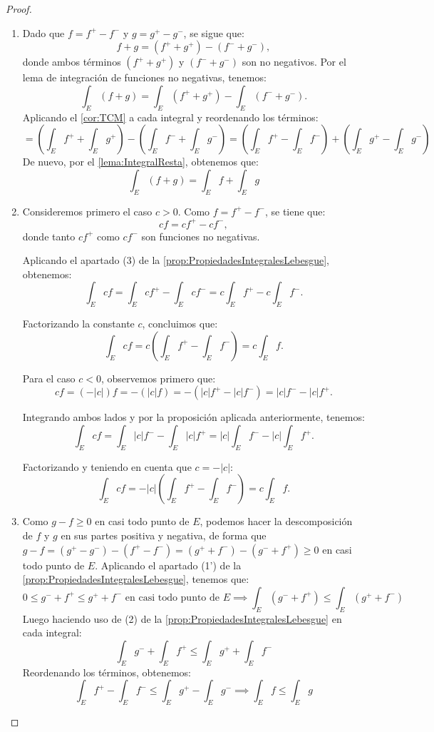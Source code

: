 \begin{proof}
    \leavevmode
    \begin{enumerate}
        \item Dado que $f = f^+ - f^-$ y $g = g^+ - g^-$, se sigue que:
        \[ f + g = (f^+ + g^+) - (f^- + g^-), \]
        donde ambos términos $(f^+ + g^+)$ y $(f^- + g^-)$ son no negativos. Por el lema de integración de funciones no negativas, tenemos:
        \[ \int_E (f + g) = \int_E (f^+ + g^+) - \int_E (f^- + g^-). \]
              Aplicando el \cref{cor:TCM} a cada integral y reordenando los términos:
                $$ = \left(\int_E f^+ + \int_E g^+\right) - \left(\int_E f^- + \int_E g^-\right) = \left(\int_E f^+ - \int_E f^-\right) + \left(\int_E g^+ - \int_E g^-\right)$$
                De nuevo, por el \cref{lema:IntegralResta}, obtenemos que:
                $$ \int_E (f+g) = \int_E f + \int_E g $$
        \item     Consideremos primero el caso $c > 0$. Como $f = f^+ - f^-$, se tiene que:
        \[ cf = cf^+ - cf^-, \]
        donde tanto $cf^+$ como $cf^-$ son funciones no negativas.
    
        Aplicando el apartado (3) de la \cref{prop:PropiedadesIntegralesLebesgue}, obtenemos:
        \[ \int_E cf = \int_E cf^+ - \int_E cf^- = c\int_E f^+ - c\int_E f^-. \]
        
        Factorizando la constante $c$, concluimos que:
        \[ \int_E cf = c\left(\int_E f^+ - \int_E f^-\right) = c\int_E f. \]
    
        Para el caso $c < 0$, observemos primero que:
        \[ cf = (-|c|)f = -(|c|f) = -(|c|f^+ - |c|f^-) = |c|f^- - |c|f^+. \]
        
        Integrando ambos lados y por la proposición aplicada anteriormente, tenemos:
        \[ \int_E cf = \int_E |c|f^- - \int_E |c|f^+ = |c|\int_E f^- - |c|\int_E f^+. \]
        
        Factorizando y teniendo en cuenta que $c = -|c|$:
        \[ \int_E cf = -|c|\left(\int_E f^+ - \int_E f^-\right) = c\int_E f. \]

        \item Como $g - f \geq 0$ en casi todo punto de $E$, podemos hacer la descomposición de $f$ y $g$ en sus partes positiva y negativa, de forma que $g - f = (g^+ - g^-) - (f^+ - f^-) = (g^+ + f^-) - (g^- + f^+) \geq 0$ en casi todo punto de $E$. Aplicando el apartado (1') de la \cref{prop:PropiedadesIntegralesLebesgue}, tenemos que:
        $$ 0 \leq g^- + f^+ \leq g^+ + f^- \text{ en casi todo punto de } E \implies \int_E (g^- + f^+) \leq \int_E (g^+ + f^-) $$
        Luego haciendo uso de (2) de la \cref{prop:PropiedadesIntegralesLebesgue} en cada integral:
        $$ \int_E g^- + \int_E f^+ \leq \int_E g^+ + \int_E f^- $$
        Reordenando los términos, obtenemos:
        $$ \int_E f^+ - \int_E f^- \leq \int_E g^+ - \int_E g^-  \implies \int_E f \leq \int_E g $$


\end{enumerate}
\end{proof}

